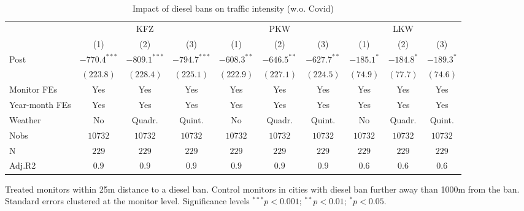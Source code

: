 
\begin{table}[h]
\caption{Impact of diesel bans on traffic intensity (w.o. Covid)}
\begin{center}
\begin{footnotesize}
\begin{threeparttable}
\begin{tabular}{l c c c c c c c c c}
\toprule
& \multicolumn{3}{c}{KFZ} & \multicolumn{3}{c}{PKW}  & \multicolumn{3}{c}{LKW} \\ \cmidrule(r){2-4} \cmidrule(r){5-7} \cmidrule(r){8-10}
 & (1) & (2) & (3) & (1) & (2) & (3) & (1) & (2) & (3) \\
\midrule
Post   & $-770.4^{***}$ & $-809.1^{***}$ & $-794.7^{***}$ & $-608.3^{**}$ & $-646.5^{**}$ & $-627.7^{**}$ & $-185.1^{*}$ & $-184.8^{*}$ & $-189.3^{*}$ \\
       & $(223.8)$      & $(228.4)$      & $(225.1)$      & $(222.9)$     & $(227.1)$     & $(224.5)$     & $(74.9)$     & $(77.7)$     & $(74.6)$     \\
\midrule
Monitor FEs   & Yes & Yes & Yes  & Yes & Yes & Yes & Yes & Yes & Yes    \\
Year-month FEs     & Yes & Yes & Yes  & Yes & Yes & Yes & Yes & Yes & Yes  \\
Weather     & No & Quadr. & Quint.  & No & Quadr. & Quint. & No & Quadr. & Quint.   \\ \midrule
Nobs   & $10732$        & $10732$        & $10732$        & $10732$       & $10732$       & $10732$       & $10732$      & $10732$      & $10732$      \\
N      & $229$          & $229$          & $229$          & $229$         & $229$         & $229$         & $229$        & $229$        & $229$        \\
Adj.R2 & $0.9$          & $0.9$          & $0.9$          & $0.9$         & $0.9$         & $0.9$         & $0.6$        & $0.6$        & $0.6$        \\
\bottomrule
\end{tabular}
\begin{tablenotes}[flushleft]
\tiny{\item Treated monitors within 25m distance to a diesel ban. 
       Control monitors in cities with diesel ban further away than 1000m from the ban. 
       Standard errors clustered at the monitor level.
       Significance levels $^{***}p<0.001$; $^{**}p<0.01$; $^{*}p<0.05$.}
\end{tablenotes}
\end{threeparttable}
\end{footnotesize}
\label{table:coefficients}
\end{center}
\end{table}
